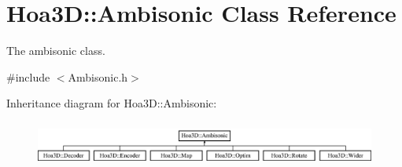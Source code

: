 \hypertarget{class_hoa3_d_1_1_ambisonic}{\section{Hoa3\-D\-:\-:Ambisonic Class Reference}
\label{class_hoa3_d_1_1_ambisonic}
}


The ambisonic class.  




{\ttfamily \#include $<$Ambisonic.\-h$>$}

Inheritance diagram for Hoa3\-D\-:\-:Ambisonic\-:\begin{figure}[H]
\begin{center}
\leavevmode
\includegraphics[height=1.517615cm]{class_hoa3_d_1_1_ambisonic}
\end{center}
\end{figure}
